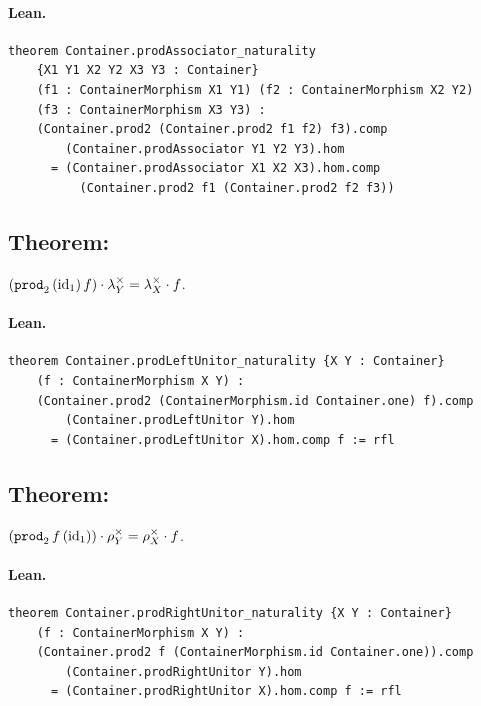 \documentclass[11pt,a4paper]{article}
\begin{document}
\paragraph{Lean.}
\begin{lstlisting}[style=lean]
theorem Container.prodAssociator_naturality
    {X1 Y1 X2 Y2 X3 Y3 : Container}
    (f1 : ContainerMorphism X1 Y1) (f2 : ContainerMorphism X2 Y2)
    (f3 : ContainerMorphism X3 Y3) :
    (Container.prod2 (Container.prod2 f1 f2) f3).comp
        (Container.prodAssociator Y1 Y2 Y3).hom
      = (Container.prodAssociator X1 X2 X3).hom.comp
          (Container.prod2 f1 (Container.prod2 f2 f3))
\end{lstlisting}


\subsection{Theorem: }

\begin{thm}
$(\texttt{prod}_2\,(\mathrm{id}_1)\,f) \cdot \lambda^\times_Y = \lambda^\times_X \cdot f$.
\end{thm}

\paragraph{Lean.}
\begin{lstlisting}[style=lean]
theorem Container.prodLeftUnitor_naturality {X Y : Container}
    (f : ContainerMorphism X Y) :
    (Container.prod2 (ContainerMorphism.id Container.one) f).comp
        (Container.prodLeftUnitor Y).hom
      = (Container.prodLeftUnitor X).hom.comp f := rfl
\end{lstlisting}


\subsection{Theorem: }

\begin{thm}
$(\texttt{prod}_2\,f\,(\mathrm{id}_1)) \cdot \rho^\times_Y = \rho^\times_X \cdot f$.
\end{thm}

\paragraph{Lean.}
\begin{lstlisting}[style=lean]
theorem Container.prodRightUnitor_naturality {X Y : Container}
    (f : ContainerMorphism X Y) :
    (Container.prod2 f (ContainerMorphism.id Container.one)).comp
        (Container.prodRightUnitor Y).hom
      = (Container.prodRightUnitor X).hom.comp f := rfl
\end{lstlisting}
\end{document}
